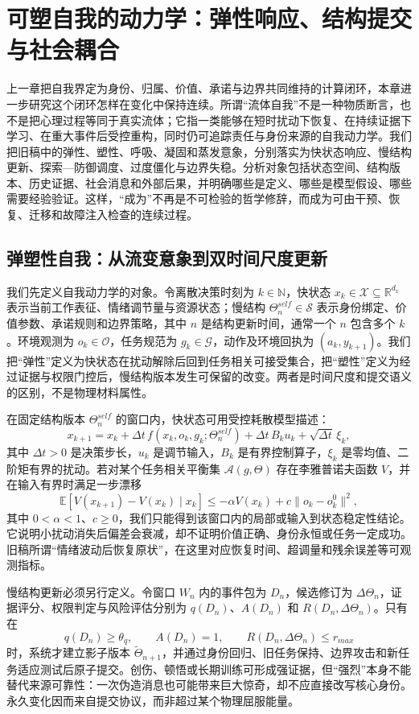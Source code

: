 \chapter{可塑自我的动力学：弹性响应、结构提交与社会耦合}
\label{chp:fluid_self}

上一章把自我界定为身份、归属、价值、承诺与边界共同维持的计算闭环，本章进一步研究这个闭环怎样在变化中保持连续。所谓“流体自我”不是一种物质断言，也不是把心理过程等同于真实流体；它指一类能够在短时扰动下恢复、在持续证据下学习、在重大事件后受控重构，同时仍可追踪责任与身份来源的自我动力学。我们把旧稿中的弹性、塑性、呼吸、凝固和蒸发意象，分别落实为快状态响应、慢结构更新、探索—防御调度、过度僵化与边界失稳。分析对象包括状态空间、结构版本、历史证据、社会消息和外部后果，并明确哪些是定义、哪些是模型假设、哪些需要经验验证。这样，“成为”不再是不可检验的哲学修辞，而成为可由干预、恢复、迁移和故障注入检查的连续过程。

\section{弹塑性自我：从流变意象到双时间尺度更新}
\label{sec:section_9346}

我们先定义自我动力学的对象。令离散决策时刻为 $k\in\mathbb{N}$，快状态 $x_k\in\mathcal{X}\subseteq\mathbb{R}^{d_x}$ 表示当前工作表征、情绪调节量与资源状态；慢结构 $\Theta_n^{self}\in\mathcal{S}$ 表示身份绑定、价值参数、承诺规则和边界策略，其中 $n$ 是结构更新时间，通常一个 $n$ 包含多个 $k$。环境观测为 $o_k\in\mathcal{O}$，任务规范为 $g_k\in\mathcal{G}$，动作及环境回执为 $(a_k,y_{k+1})$。我们把“弹性”定义为快状态在扰动解除后回到任务相关可接受集合，把“塑性”定义为经过证据与权限门控后，慢结构版本发生可保留的改变。两者是时间尺度和提交语义的区别，不是物理材料属性。

在固定结构版本 $\Theta_n^{self}$ 的窗口内，快状态可用受控耗散模型描述：
\[
x_{k+1}=x_k+\Delta t\,f(x_k,o_k,g_k;\Theta_n^{self})
+\Delta t\,B_k u_k+\sqrt{\Delta t}\,\xi_k,
\]
其中 $\Delta t>0$ 是决策步长，$u_k$ 是调节输入，$B_k$ 是有界控制算子，$\xi_k$ 是零均值、二阶矩有界的扰动。若对某个任务相关平衡集 $\mathcal{A}(g,\Theta)$ 存在李雅普诺夫函数 $V$，并在输入有界时满足一步漂移
\[
\mathbb{E}[V(x_{k+1})-V(x_k)\mid x_k]\le -\alpha V(x_k)+c\|o_k-o_k^0\|^2,
\]
其中 $0<\alpha<1$、$c\ge0$，我们只能得到该窗口内的局部或输入到状态稳定性结论。它说明小扰动消失后偏差会衰减，却不证明价值正确、身份永恒或任务一定成功。旧稿所谓“情绪波动后恢复原状”，在这里对应恢复时间、超调量和残余误差等可观测指标。

慢结构更新必须另行定义。令窗口 $W_n$ 内的事件包为 $D_n$，候选修订为 $\Delta\Theta_n$，证据评分、权限判定与风险评估分别为 $q(D_n)$、$A(D_n)$ 和 $R(D_n,\Delta\Theta_n)$。只有在
\[
q(D_n)\ge\theta_q,\qquad A(D_n)=1,\qquad
R(D_n,\Delta\Theta_n)\le r_{max}
\]
时，系统才建立影子版本 $\widetilde\Theta_{n+1}$，并通过身份回归、旧任务保持、边界攻击和新任务适应测试后原子提交。创伤、顿悟或长期训练可形成强证据，但“强烈”本身不能替代来源可靠性：一次伪造消息也可能带来巨大惊奇，却不应直接改写核心身份。永久变化因而来自提交协议，而非超过某个物理屈服能量。


